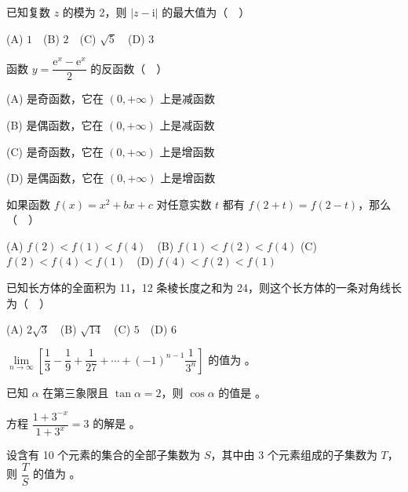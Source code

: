 \begin{question}
已知复数 \(z\) 的模为 2，则 \(|z-\mathrm{i}|\) 的最大值为（　）

(A) \(1\)　(B) \(2\)　(C) \(\sqrt{5}\)　(D) \(3\)

\end{question}
\begin{question}
函数 \(y=\dfrac{\mathrm{e}^x-\mathrm{e}^x}{2}\) 的反函数（　）

(A) 是奇函数，它在 \((0,+\infty)\) 上是减函数

(B) 是偶函数，它在 \((0,+\infty)\) 上是减函数

(C) 是奇函数，它在 \((0,+\infty)\) 上是增函数

(D) 是偶函数，它在 \((0,+\infty)\) 上是增函数

\end{question}
\begin{question}
如果函数 \(f(x)=x^2+bx+c\) 对任意实数 \(t\) 都有 \(f(2+t)=f(2-t)\)，那么（　）

(A) \(f(2)<f(1)<f(4)\)　(B) \(f(1)<f(2)<f(4)\)
(C) \(f(2)<f(4)<f(1)\)　(D) \(f(4)<f(2)<f(1)\)

\end{question}
\begin{question}
已知长方体的全面积为 11，12 条棱长度之和为 24，则这个长方体的一条对角线长为（　）

(A) \(2\sqrt{3}\)　(B) \(\sqrt{14}\)　(C) \(5\)　(D) \(6\)

\end{question}
\begin{question}
\(\lim\limits_{n\to\infty}\left[\dfrac{1}{3}-\dfrac{1}{9}+\dfrac{1}{27}+\cdots+(-1)^{n-1}\dfrac{1}{3^n}\right]\) 的值为 \underline{\qquad}。

\end{question}
\begin{question}
已知 \(\alpha\) 在第三象限且 \(\tan\alpha=2\)，则 \(\cos\alpha\) 的值是 \underline{\qquad}。

\end{question}
\begin{question}
方程 \(\dfrac{1+3^{-x}}{1+3^x}=3\) 的解是 \underline{\qquad}。

\end{question}
\begin{question}
设含有 10 个元素的集合的全部子集数为 \(S\)，其中由 3 个元素组成的子集数为 \(T\)，则 $\mbox{\(\dfrac{T}{S}\)}$ 的值为 \underline{\qquad}。

\end{question}
